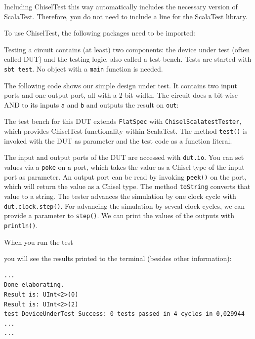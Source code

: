 \documentclass[%
    10pt,
    headinclude, footexclude,
    openright, %
    notitlepage,
    cleardoubleempty,
    headsepline,
    pointlessnumbers,
    bibtotoc, idxtotoc,
    ]{scrbook}
\newcommand{\code}[1]{{\small{\texttt{#1}}}}
\begin{document}
\noindent Including ChiselTest this way automatically includes the necessary version of ScalaTest.
Therefore, you do not need to include a line for the ScalaTest library.

To use ChiselTest, the following packages need to be imported:


\noindent Testing a circuit contains (at least) two components: the device under test (often
called DUT) and the testing logic, also called a test bench. Tests are started with \code{sbt test}.
No object with a \code{main} function is needed.

The following code shows our simple design under test. It contains two input
ports and one output port, all with a 2-bit width. The circuit does a bit-wise AND
to its inputs \code{a} and \code{b} and outputs the result on \code{out}:


The test bench for this DUT extends \code{FlatSpec} with \code{ChiselScalatestTester},
which provides ChiselTest functionality within ScalaTest.
The method \code{test()} is invoked with the DUT as parameter and the test code as a function literal.



The input and output ports of the DUT are accessed with \code{dut.io}.
You can set values via a \code{poke} on a port, which takes the value as a Chisel type of the
input port as parameter.
An output port can be read by invoking \code{peek()} on the port, which will return
the value as a Chisel type. The method \code{toString} converts that value to a
string.
The tester advances the simulation by one clock cycle with \code{dut.clock.step()}.
For advancing the simulation by seveal clock cycles, we can provide a parameter to
\code{step()}.
We can print the values of the outputs with \code{println()}.



When you run the test


\noindent you will see the results printed to the terminal
(besides other information):

\begin{verbatim}
...
Done elaborating.
Result is: UInt<2>(0)
Result is: UInt<2>(2)
test DeviceUnderTest Success: 0 tests passed in 4 cycles in 0,029944 ...
...
\end{verbatim}
\end{document}

